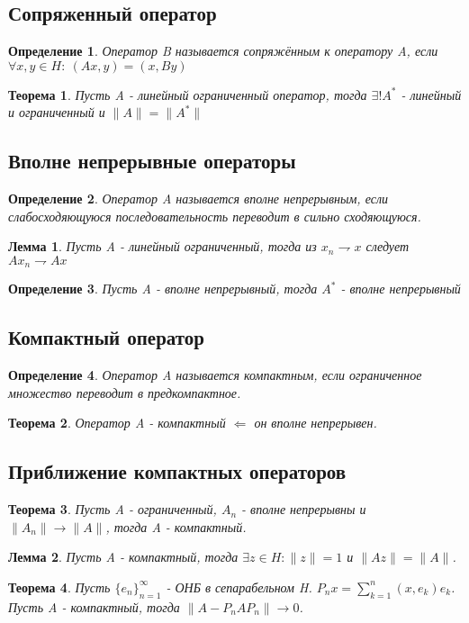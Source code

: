 \documentclass[9pt, a4paper]{extarticle}
\newtheorem{theorem}{Теорема}
\newtheorem{lemma}{Лемма}
\newtheorem{definition}{Определение}
\numberwithin{equation}{section}
\numberwithin{lemma}{section}
\numberwithin{definition}{section}
\numberwithin{notabene}{section}
\numberwithin{corollary}{section}
\begin{document}
\subsection{Сопряженный оператор}
	\begin{definition}
		Оператор B называется сопряжённым к оператору A, если $\forall x, y \in H: \ (Ax, y) = (x, By)$
	\end{definition}
	\begin{theorem}
		Пусть A - линейный ограниченный оператор, тогда $\exists! A^*$ - линейный и ограниченный и $\|A\| = \|A^*\|$
	\end{theorem}
\subsection{Вполне непрерывные операторы}
	\begin{definition}
		Оператор A называется вполне непрерывным, если слабосходяющуюся последовательность переводит в сильно сходяющуюся.
	\end{definition}
	\begin{lemma}
		Пусть A - линейный ограниченный, тогда из $x_n \rightharpoondown x$ следует $Ax_n  \rightharpoondown  Ax$
	\end{lemma}
	\begin{definition}
		Пусть A - вполне непрерывный, тогда $A^*$ - вполне непрерывный
	\end{definition}
\subsection{Компактный оператор}
	\begin{definition}
		Оператор A называется компактным, если ограниченное множество переводит в предкомпактное.
	\end{definition}
	\begin{theorem}
		Оператор A - компактный $\Leftarrow$ он вполне непрерывен. 
	\end{theorem}
\subsection{Приближение компактных операторов}
	\begin{theorem}
		Пусть A - ограниченный, $A_n$ - вполне непрерывны и $\|A_n\| \to \|A\|$, тогда A - компактный. 	
	\end{theorem}
	\begin{lemma}
		Пусть A - компактный, тогда $\exists z \in H: \|z\| = 1$ и $\|Az\| = \|A\|$.
	\end{lemma}
	\begin{theorem}
		Пусть $\{e_n\}_{n=1}^\infty$ - ОНБ в сепарабельном H. $P_nx  = \sum\limits_{k=1}^{n} (x,e_k) e_k$. Пусть A - компактный, тогда $\|A - P_nAP_n\| \to 0$.
	\end{theorem}
\end{document}
